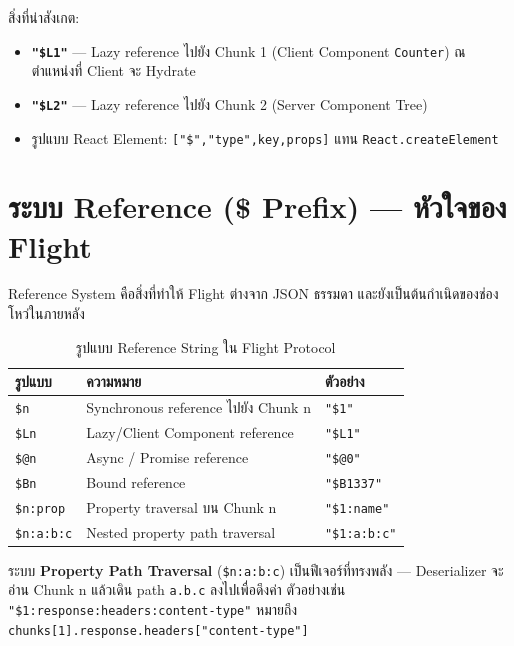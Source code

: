 \documentclass[12pt,oneside]{report}
\begin{document}
สิ่งที่น่าสังเกต:
\begin{itemize}[leftmargin=1.5cm]
    \item \textbf{\texttt{"\$L1"}} — Lazy reference ไปยัง Chunk 1 (Client Component \texttt{Counter}) ณ ตำแหน่งที่ Client จะ Hydrate
    \item \textbf{\texttt{"\$L2"}} — Lazy reference ไปยัง Chunk 2 (Server Component Tree)
    \item รูปแบบ React Element: \texttt{["\$","type",key,props]} แทน \texttt{React.createElement}
\end{itemize}

\newpage

\section{ระบบ Reference (\$ Prefix) — หัวใจของ Flight}

Reference System คือสิ่งที่ทำให้ Flight ต่างจาก JSON ธรรมดา และยังเป็นต้นกำเนิดของช่องโหว่ในภายหลัง

\begin{table}[ht]
    \centering
    \caption{รูปแบบ Reference String ใน Flight Protocol}
    \vspace{0.3cm}
    \begin{tabular}{lll}
        \toprule
        \textbf{รูปแบบ} & \textbf{ความหมาย} & \textbf{ตัวอย่าง} \\
        \midrule
        \texttt{\$n} & Synchronous reference ไปยัง Chunk n & \texttt{"\$1"} \\
        \texttt{\$Ln} & Lazy/Client Component reference & \texttt{"\$L1"} \\
        \texttt{\$@n} & Async / Promise reference & \texttt{"\$@0"} \\
        \texttt{\$Bn} & Bound reference & \texttt{"\$B1337"} \\
        \texttt{\$n:prop} & Property traversal บน Chunk n & \texttt{"\$1:name"} \\
        \texttt{\$n:a:b:c} & Nested property path traversal & \texttt{"\$1:a:b:c"} \\
        \bottomrule
    \end{tabular}
    \label{tab:references}
\end{table}

ระบบ \textbf{Property Path Traversal} (\texttt{\$n:a:b:c}) เป็นฟีเจอร์ที่ทรงพลัง — Deserializer จะอ่าน Chunk n แล้วเดิน path \texttt{a.b.c} ลงไปเพื่อดึงค่า ตัวอย่างเช่น \texttt{"\$1:response:headers:content-type"} หมายถึง \texttt{chunks[1].response.headers["content-type"]}
\end{document}
